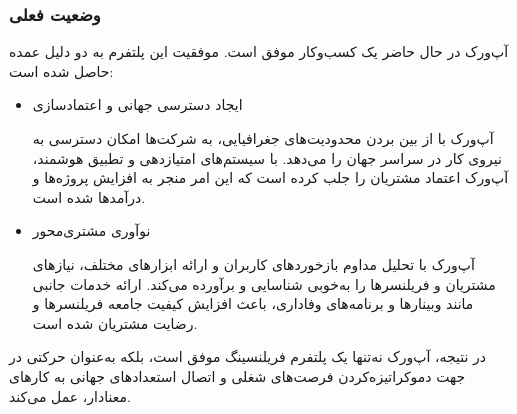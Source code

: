 \documentclass[dvipsnames, svgnames, x11names, 11pt, twocolumn]{article}
\begin{document}
\subsubsection{وضعیت فعلی}

آپ‌ورک در حال حاضر یک کسب‌وکار موفق است. موفقیت این پلتفرم به دو دلیل عمده حاصل شده است:

\begin{itemize}
\item 
ایجاد دسترسی جهانی و اعتمادسازی

آپ‌ورک با از بین بردن محدودیت‌های جغرافیایی، به شرکت‌ها امکان دسترسی به نیروی کار در سراسر جهان را می‌دهد. با سیستم‌های امتیازدهی و تطبیق هوشمند، آپ‌ورک اعتماد مشتریان را جلب کرده است که این امر منجر به افزایش پروژه‌ها و درآمدها شده است.

\item
نوآوری مشتری‌محور

آپ‌ورک با تحلیل مداوم بازخوردهای کاربران و ارائه ابزارهای مختلف، نیازهای مشتریان و فریلنسرها را به‌خوبی شناسایی و برآورده می‌کند. ارائه خدمات جانبی مانند وبینارها و برنامه‌های وفاداری، باعث افزایش کیفیت جامعه فریلنسرها و رضایت مشتریان شده است.
\end{itemize}
در نتیجه، آپ‌ورک نه‌تنها یک پلتفرم فریلنسینگ موفق است، بلکه به‌عنوان حرکتی در جهت دموکراتیزه‌کردن فرصت‌های شغلی و اتصال استعدادهای جهانی به کارهای معنادار، عمل می‌کند.
\end{document}
